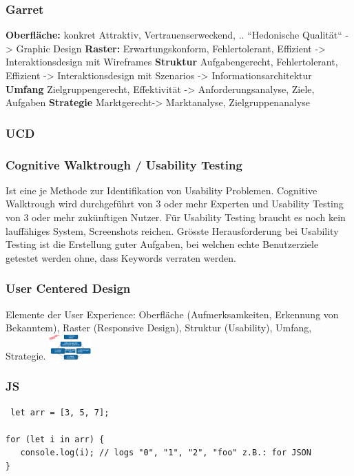 \begin{multicols*}{4}
\subsubsection{Garret}
\textbf{Oberfläche:} konkret Attraktiv, Vertrauenserweckend, .. “Hedonische Qualität“
-> Graphic Design
\textbf{Raster:} Erwartungskonform, Fehlertolerant, Effizient -> Interaktionsdesign mit Wireframes
\textbf{Struktur} Aufgabengerecht, Fehlertolerant, Effizient
-> Interaktionsdesign mit Szenarios -> Informationsarchitektur
\textbf{Umfang} Zielgruppengerecht, Effektivität -> Anforderungsanalyse, Ziele, Aufgaben
\textbf{Strategie}  Marktgerecht-> Marktanalyse, Zielgruppenanalyse
\subsubsection{UCD}
\begin{multicols}{2}
\subsubsection{Cognitive Walktrough / Usability Testing}
\tiny Ist eine je Methode zur Identifikation von Usability Problemen. Cognitive 
Walktrough wird durchgeführt von 3 oder mehr Experten und Usability Testing 
von 3 oder mehr zukünftigen Nutzer. Für Usability Testing braucht es noch kein 
lauffähiges System, Screenshots reichen. Grösste Herausforderung bei Usability 
Testing ist die Erstellung guter Aufgaben, bei welchen echte Benutzerziele getestet 
werden ohne, dass Keywords verraten werden.
\subsubsection{User Centered Design}
Elemente der User Experience: Oberfläche (Aufmerksamkeiten, 
Erkennung von Bekanntem), Raster (Responsive Design), Struktur (Usability), 
Umfang, Strategie.
\includegraphics[width=0.12\textwidth]{images/ucd}
\end{multicols}
\subsubsection{JS}
 \begin{verbatim}
 let arr = [3, 5, 7];

for (let i in arr) {
   console.log(i); // logs "0", "1", "2", "foo" z.B.: for JSON
}


\end{verbatim}
\end{multicols*}

